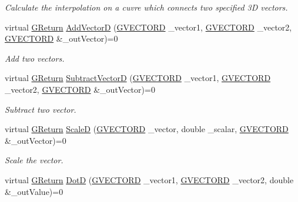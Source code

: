 \begin{DoxyCompactItemize}
\begin{DoxyCompactList}\small\item\em Calculate the interpolation on a cuvre which connects two specified 3D vectors. \end{DoxyCompactList}\item 
virtual \mbox{\hyperlink{namespaceGW_a67a839e3df7ea8a5c5686613a7a3de21}{G\+Return}} \mbox{\hyperlink{classGW_1_1MATH_1_1GVector_a3c795ce49b0b71dc83528e3b89a1b1ff}{Add\+VectorD}} (\mbox{\hyperlink{structGW_1_1MATH_1_1GVECTORD}{G\+V\+E\+C\+T\+O\+RD}} \+\_\+vector1, \mbox{\hyperlink{structGW_1_1MATH_1_1GVECTORD}{G\+V\+E\+C\+T\+O\+RD}} \+\_\+vector2, \mbox{\hyperlink{structGW_1_1MATH_1_1GVECTORD}{G\+V\+E\+C\+T\+O\+RD}} \&\+\_\+out\+Vector)=0
\begin{DoxyCompactList}\small\item\em Add two vectors. \end{DoxyCompactList}\item 
virtual \mbox{\hyperlink{namespaceGW_a67a839e3df7ea8a5c5686613a7a3de21}{G\+Return}} \mbox{\hyperlink{classGW_1_1MATH_1_1GVector_ae060722225a95e48c83c9c4adead93e0}{Subtract\+VectorD}} (\mbox{\hyperlink{structGW_1_1MATH_1_1GVECTORD}{G\+V\+E\+C\+T\+O\+RD}} \+\_\+vector1, \mbox{\hyperlink{structGW_1_1MATH_1_1GVECTORD}{G\+V\+E\+C\+T\+O\+RD}} \+\_\+vector2, \mbox{\hyperlink{structGW_1_1MATH_1_1GVECTORD}{G\+V\+E\+C\+T\+O\+RD}} \&\+\_\+out\+Vector)=0
\begin{DoxyCompactList}\small\item\em Subtract two vector. \end{DoxyCompactList}\item 
virtual \mbox{\hyperlink{namespaceGW_a67a839e3df7ea8a5c5686613a7a3de21}{G\+Return}} \mbox{\hyperlink{classGW_1_1MATH_1_1GVector_a43e69ae3ed90a6ade1d6137409766fbe}{ScaleD}} (\mbox{\hyperlink{structGW_1_1MATH_1_1GVECTORD}{G\+V\+E\+C\+T\+O\+RD}} \+\_\+vector, double \+\_\+scalar, \mbox{\hyperlink{structGW_1_1MATH_1_1GVECTORD}{G\+V\+E\+C\+T\+O\+RD}} \&\+\_\+out\+Vector)=0
\begin{DoxyCompactList}\small\item\em Scale the vector. \end{DoxyCompactList}\item 
virtual \mbox{\hyperlink{namespaceGW_a67a839e3df7ea8a5c5686613a7a3de21}{G\+Return}} \mbox{\hyperlink{classGW_1_1MATH_1_1GVector_ad159973274edb5ded88a21f2e196c3ab}{DotD}} (\mbox{\hyperlink{structGW_1_1MATH_1_1GVECTORD}{G\+V\+E\+C\+T\+O\+RD}} \+\_\+vector1, \mbox{\hyperlink{structGW_1_1MATH_1_1GVECTORD}{G\+V\+E\+C\+T\+O\+RD}} \+\_\+vector2, double \&\+\_\+out\+Value)=0

\end{DoxyCompactItemize}
